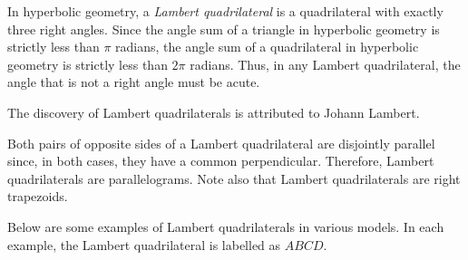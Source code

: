 \documentclass[12pt]{article}
\begin{document}
In hyperbolic geometry, a \emph{Lambert quadrilateral} is a quadrilateral with exactly three right angles.  Since the angle sum of a triangle in hyperbolic geometry is strictly less than $\pi$ radians, the angle sum of a quadrilateral in hyperbolic geometry is strictly less than $2\pi$ radians.  Thus, in any Lambert quadrilateral, the angle that is not a right angle must be acute.

The discovery of Lambert quadrilaterals is attributed to Johann Lambert.

Both pairs of opposite sides of a Lambert quadrilateral are disjointly parallel since, in both cases, they have a common perpendicular.  Therefore, Lambert quadrilaterals are parallelograms.  Note also that Lambert quadrilaterals are right trapezoids.

Below are some examples of Lambert quadrilaterals in various models.  In each example, the Lambert quadrilateral is labelled as $ABCD$.
\end{document}
